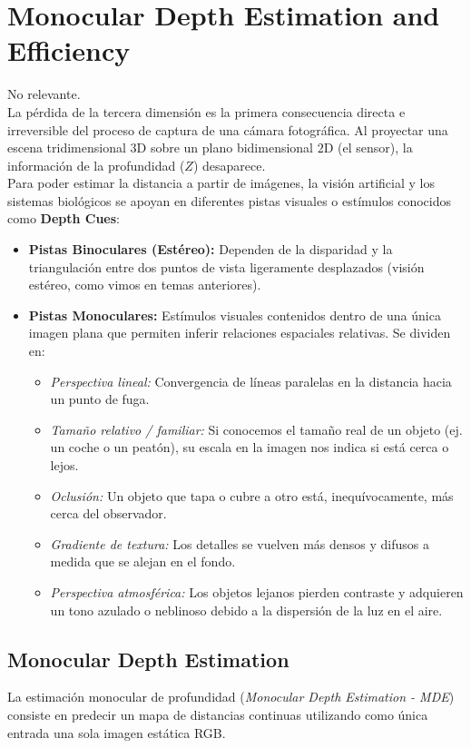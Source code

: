 \chapter{Monocular Depth Estimation and Efficiency}
\noindent
No relevante.\\


\noindent
La pérdida de la tercera dimensión es la primera consecuencia directa e irreversible del proceso de captura de una cámara fotográfica. Al proyectar una escena tridimensional $3\text{D}$ sobre un plano bidimensional $2\text{D}$ (el sensor), la información de la profundidad ($Z$) desaparece. \\

\noindent
Para poder estimar la distancia a partir de imágenes, la visión artificial y los sistemas biológicos se apoyan en diferentes pistas visuales o estímulos conocidos como \textbf{Depth Cues}:

\begin{itemize}
    \item \textbf{Pistas Binoculares (Estéreo):} Dependen de la disparidad y la triangulación entre dos puntos de vista ligeramente desplazados (visión estéreo, como vimos en temas anteriores).
    \item \textbf{Pistas Monoculares:} Estímulos visuales contenidos dentro de una única imagen plana que permiten inferir relaciones espaciales relativas. Se dividen en:
    \begin{itemize}
        \item \textit{Perspectiva lineal:} Convergencia de líneas paralelas en la distancia hacia un punto de fuga.
        \item \textit{Tamaño relativo / familiar:} Si conocemos el tamaño real de un objeto (ej. un coche o un peatón), su escala en la imagen nos indica si está cerca o lejos.
        \item \textit{Oclusión:} Un objeto que tapa o cubre a otro está, inequívocamente, más cerca del observador.
        \item \textit{Gradiente de textura:} Los detalles se vuelven más densos y difusos a medida que se alejan en el fondo.
        \item \textit{Perspectiva atmosférica:} Los objetos lejanos pierden contraste y adquieren un tono azulado o neblinoso debido a la dispersión de la luz en el aire.
    \end{itemize}
\end{itemize}

\section{Monocular Depth Estimation}
La estimación monocular de profundidad (\textit{Monocular Depth Estimation - MDE}) consiste en predecir un mapa de distancias continuas utilizando como única entrada una sola imagen estática RGB.

